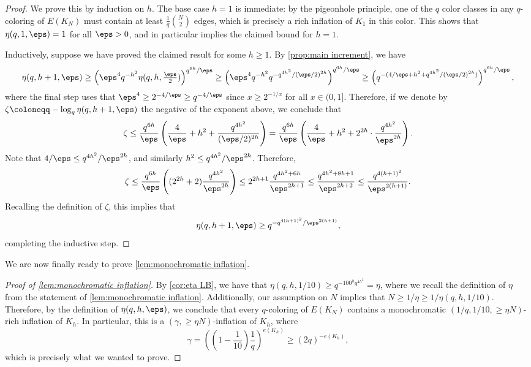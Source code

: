 \begin{proof}
    We prove this by induction on $h$. The base case $h=1$ is immediate: by the pigeonhole principle, one of the $q$ color classes in any $q$-coloring of $E(K_N)$ must contain at least $\frac 1q \binom N2$ edges, which is precisely a rich inflation of $K_1$ in this color. This shows that $\eta(q,1,\eps) = 1$ for all $\eps>0$, and in particular implies the claimed bound for $h=1$.

    Inductively, suppose we have proved the claimed result for some $h\geq 1$. By \cref{prop:main increment}, we have
    \begin{equation*}
        \eta(q,h+1,\eps) \geq \left(\eps^4 q^{-h^2} \eta(q,h,\tfrac\eps2)\right)^{q^{6h}/\eps} \geq \left( \eps^4 q^{-h^2} q^{-q^{4h^2}/(\eps/2)^{2h}}\right)^{q^{6h}/\eps} \geq \left( q^{-(4/\eps +h^2 + q^{4h^2}/(\eps/2)^{2h})}\right)^{q^{6h}/\eps},
    \end{equation*}
    where the final step uses that
     $\eps^4 \geq 2^{-4/\eps} \geq q^{-4/\eps}$ since $x \geq 2^{-1/x}$ for all $x \in (0,1]$. Therefore, if we denote by $\zeta \coloneqq -\log_q \eta(q,h+1,\eps)$ the negative of the exponent above, we conclude that
     \begin{align*}
         \zeta \leq \frac{q^{6h}}{\eps}\left( \frac 4 \eps + h^2 + \frac{q^{4h^2}}{(\eps/2)^{2h}}\right) =\frac{q^{6h}}{\eps}\left( \frac 4 \eps + h^2 + 2^{2h}\cdot \frac{q^{4h^2}}{\eps^{2h}}\right).
     \end{align*}
     Note that $4/\eps \leq q^{4h^2}/\eps^{2h}$, and similarly $h^2 \leq q^{4h^2}/\eps^{2h}$. Therefore,
     \[
     \zeta \leq \frac{q^{6h}}{\eps} \left( (2^{2h}+2) \frac{q^{4h^2}}{\eps^{2h}}\right) \leq 2^{2h+1} \frac{q^{4h^2+6h}}{\eps^{2h+1}} \leq \frac{q^{4h^2+8h+1}}{\eps^{2h+2}} \leq \frac{q^{4(h+1)^2}}{\eps^{2(h+1)}}.
     \]
     Recalling the definition of $\zeta$, this implies that
     \[
     \eta(q,h+1,\eps) \geq q^{-q^{4(h+1)^2}/\eps^{2(h+1)}},
     \]
     completing the inductive step.
\end{proof}

We are now finally ready to prove \cref{lem:monochromatic inflation}.
\begin{proof}[Proof of \cref{lem:monochromatic inflation}]
By \cref{cor:eta LB}, we have that $\eta(q,h,1/10) \geq q^{-100^h q^{4h^2}} = \eta$, where we recall the definition of $\eta$ from the statement of \cref{lem:monochromatic inflation}. Additionally, our assumption on $N$ implies that $N \geq 1/\eta \geq 1/\eta(q,h,1/10)$. Therefore, by the definition of $\eta(q,h,\eps)$, we conclude that every $q$-coloring of $E(K_N)$ contains a monochromatic $(1/q, 1/10, \geq \eta N)$-rich inflation of $K_h$. In particular, this is a $(\gamma,\geq \eta N)$-inflation of $K_h$, where
\[
\gamma = \left(\left(1-\frac 1{10}\right) \frac 1 q\right)^{e(K_h)} \geq (2q)^{-e(K_h)},
\]
which is precisely what we wanted to prove.
\end{proof}


